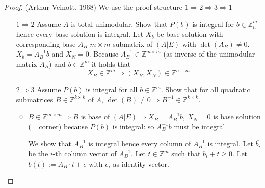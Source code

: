 \documentclass{article}
\begin{document}
\begin{proof}
  (Arthur Veinott, 1968)
  We use the proof structure $1 \Rightarrow 2 \Rightarrow 3 \Rightarrow 1$

  \begin{itemize}
    \item[$1 \Rightarrow 2$]
      Assume $A$ is total unimodular. Show that $P(b)$ is integral for $b \in \mathbb{Z}^m_n$ hence every base solution is integral. Let $X_b$ be base solution with corresponding base $A_B$ $m \times m$ submatrix of $(A | E)$ with $\det(A_B) \neq 0$. $X_b = A_B^{-1}b$ and $X_N = 0$. Because $A_B^{-1} \in \mathbb{Z}^{m \times m}$ (as inverse of the unimodular matrix $A_B$) and $b \in \mathbb{Z}^m$ it holds that
      \[
        X_B \in \mathbb{Z}^m \Rightarrow (X_B, X_N) \in \mathbb{Z}^{n + m}
      \]
    \item[$2 \Rightarrow 3$]
      Assume $P(b)$ is integral for all $b \in \mathbb{Z}^m$.
      Show that for all quadratic submatrices $B \in \mathbb{Z}^{k\times k}$ of $A$, $\det(B) \neq 0 \Rightarrow B^{-1} \in \mathbb{Z}^{k\times k}$.
      \begin{itemize}
        \item
          $B \in \mathbb{Z}^{m\times m} \Rightarrow B$ is base of $(A | E) \Rightarrow X_B = A_B^{-1} b$, $X_N = 0$ is base solution (= corner) because $P(b)$ is integral: so $A_B^{-1} b$ must be integral.

          We show that $A_B^{-1}$ is integral hence every column of $A_B^{-1}$ is integral. Let $\overline{b_i}$ be the $i$-th column vector of $A_B^{-1}$. Let $t \in \mathbb{Z}^m$ such that $\overline{b_i} + t \geq 0$. Let $b(t) := A_B \cdot t + e$ with $e_i$ as identity vector.


\end{itemize}
\end{itemize}
\end{proof}
\end{document}
